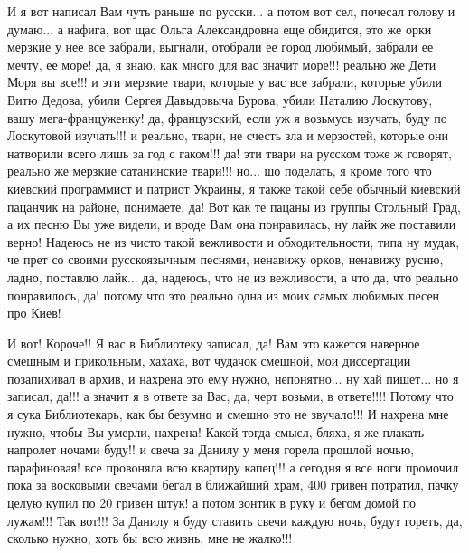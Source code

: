 И я вот написал Вам чуть раньше
по русски... а потом вот сел, почесал голову и думаю... а нафига, вот щас Ольга
Александровна еще обидится, это же орки мерзкие у нее все забрали, выгнали,
отобрали ее город любимый, забрали ее мечту, ее море! да, я знаю, как много для
вас значит море!!! реально же Дети Моря вы все!!!  и эти мерзкие твари, которые
у вас все забрали, которые убили Витю Дедова, убили Сергея Давыдовыча Бурова,
убили Наталию Лоскутову, вашу мега-француженку! да, французский, если уж я
возьмусь изучать, буду по Лоскутовой изучать!!!  и реально, твари, не счесть
зла и мерзостей, которые они натворили всего лишь за год с гаком!!!  да! эти
твари на русском тоже ж говорят, реально же мерзкие сатанинские твари!!! но...
шо поделать, я кроме того что киевский программист и патриот Украины, я также
такой себе обычный киевский пацанчик на районе, понимаете, да! Вот как те
пацаны из группы Стольный Град, а их песню Вы уже видели, и вроде Вам она
понравилась, ну лайк же поставили верно! Надеюсь не из чисто такой вежливости и
обходительности, типа ну мудак, че прет со своими русскоязычным песнями,
ненавижу орков, ненавижу русню, ладно, поставлю лайк...  да, надеюсь, что не из
вежливости, а что да, что реально понравилось, да!  потому что это реально одна
из моих самых любимых песен про Киев!

И вот! Короче!! Я вас в Библиотеку записал, да! Вам это кажется наверное
смешным и прикольным, хахаха, вот чудачок смешной, мои диссертации позапихивал
в архив, и нахрена это ему нужно, непонятно... ну хай пишет...  но я записал,
да!!! а значит я в ответе за Вас, да, черт возьми, в ответе!!!!  Потому что я
сука Библиотекарь, как бы безумно и смешно это не звучало!!!  И нахрена мне
нужно, чтобы Вы умерли, нахрена! Какой тогда смысл, бляха, я же плакать
напролет ночами буду!!  и свеча за Данилу у меня горела прошлой ночью,
парафиновая! все провоняла всю квартиру капец!!!  а сегодня я все ноги промочил
пока за восковыми свечами бегал в ближайший храм, 400 гривен потратил, пачку
целую купил по 20 гривен штук! а потом зонтик в руку и бегом домой по лужам!!!
Так вот!!! За Данилу я буду ставить свечи каждую ночь, будут гореть, да,
сколько нужно, хоть бы всю жизнь, мне не жалко!!!  

